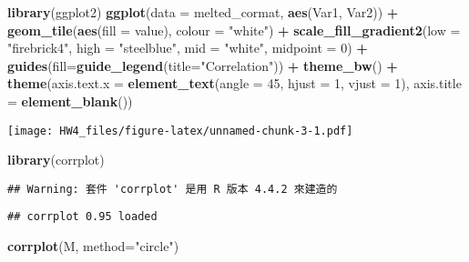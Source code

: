 \documentclass[
]{article}
\newenvironment{Shaded}{\begin{snugshade}}{\end{snugshade}}
\newcommand{\AttributeTok}[1]{\textcolor[rgb]{0.13,0.29,0.53}{#1}}
\newcommand{\DecValTok}[1]{\textcolor[rgb]{0.00,0.00,0.81}{#1}}
\newcommand{\FunctionTok}[1]{\textcolor[rgb]{0.13,0.29,0.53}{\textbf{#1}}}
\newcommand{\NormalTok}[1]{#1}
\newcommand{\SpecialCharTok}[1]{\textcolor[rgb]{0.81,0.36,0.00}{\textbf{#1}}}
\newcommand{\StringTok}[1]{\textcolor[rgb]{0.31,0.60,0.02}{#1}}
\begin{document}
\begin{Shaded}
\begin{Highlighting}[]
\FunctionTok{library}\NormalTok{(ggplot2)}
\FunctionTok{ggplot}\NormalTok{(}\AttributeTok{data =}\NormalTok{ melted\_cormat,}
       \FunctionTok{aes}\NormalTok{(Var1, Var2)) }\SpecialCharTok{+}
  \FunctionTok{geom\_tile}\NormalTok{(}\FunctionTok{aes}\NormalTok{(}\AttributeTok{fill =}\NormalTok{ value), }\AttributeTok{colour =} \StringTok{"white"}\NormalTok{) }\SpecialCharTok{+}
  \FunctionTok{scale\_fill\_gradient2}\NormalTok{(}\AttributeTok{low =} \StringTok{"firebrick4"}\NormalTok{, }\AttributeTok{high =} \StringTok{"steelblue"}\NormalTok{,}
                       \AttributeTok{mid =} \StringTok{"white"}\NormalTok{, }\AttributeTok{midpoint =} \DecValTok{0}\NormalTok{) }\SpecialCharTok{+}
  \FunctionTok{guides}\NormalTok{(}\AttributeTok{fill=}\FunctionTok{guide\_legend}\NormalTok{(}\AttributeTok{title=}\StringTok{"Correlation"}\NormalTok{)) }\SpecialCharTok{+}
  \FunctionTok{theme\_bw}\NormalTok{() }\SpecialCharTok{+}
  \FunctionTok{theme}\NormalTok{(}\AttributeTok{axis.text.x =} \FunctionTok{element\_text}\NormalTok{(}\AttributeTok{angle =} \DecValTok{45}\NormalTok{, }\AttributeTok{hjust =} \DecValTok{1}\NormalTok{, }\AttributeTok{vjust =} \DecValTok{1}\NormalTok{),}
        \AttributeTok{axis.title =} \FunctionTok{element\_blank}\NormalTok{())}
\end{Highlighting}
\end{Shaded}

\texttt{[image: HW4\_files/figure-latex/unnamed-chunk-3-1.pdf]}

\begin{Shaded}
\begin{Highlighting}[]
\FunctionTok{library}\NormalTok{(corrplot)}
\end{Highlighting}
\end{Shaded}

\begin{verbatim}
## Warning: 套件 'corrplot' 是用 R 版本 4.4.2 來建造的
\end{verbatim}

\begin{verbatim}
## corrplot 0.95 loaded
\end{verbatim}

\begin{Shaded}
\begin{Highlighting}[]
\FunctionTok{corrplot}\NormalTok{(M, }\AttributeTok{method=}\StringTok{"circle"}\NormalTok{)}
\end{Highlighting}
\end{Shaded}
\end{document}
